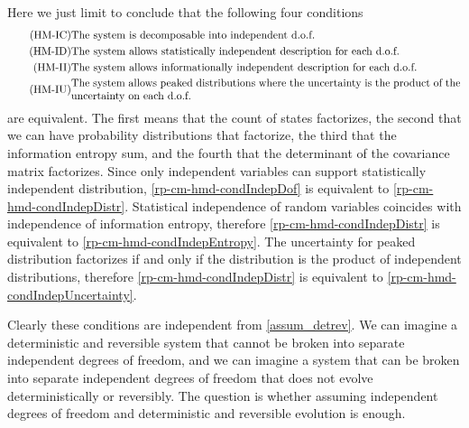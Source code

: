 Here we just limit to conclude that the following four conditions
\begin{align}
	\tag{HM-IC}\label{rp-cm-hmd-condIndepDof}
	&\text{The system is decomposable into independent d.o.f.} \\
	\tag{HM-ID}\label{rp-cm-hmd-condIndepDistr}
	&\text{The system allows statistically independent description for each d.o.f.} \\
	\tag{HM-II}\label{rp-cm-hmd-condIndepEntropy}
	&\text{The system allows informationally independent description for each d.o.f.} \\
	\tag{HM-IU}\label{rp-cm-hmd-condIndepUncertainty}
	&\parbox{5in}{The system allows peaked distributions where the uncertainty is the product of the uncertainty on each d.o.f.}
\end{align}
are equivalent. The first means that the count of states factorizes, the second that we can have probability distributions that factorize, the third that the information entropy sum, and the fourth that the determinant of the covariance matrix factorizes. Since only independent variables can support statistically independent distribution, \ref{rp-cm-hmd-condIndepDof} is equivalent to \ref{rp-cm-hmd-condIndepDistr}. Statistical independence of random variables coincides with independence of information entropy, therefore \ref{rp-cm-hmd-condIndepDistr} is equivalent to \ref{rp-cm-hmd-condIndepEntropy}. The uncertainty for peaked distribution factorizes if and only if the distribution is the product of independent distributions, therefore  \ref{rp-cm-hmd-condIndepDistr} is equivalent to \ref{rp-cm-hmd-condIndepUncertainty}.

Clearly these conditions are independent from \ref{assum_detrev}. We can imagine a deterministic and reversible system that cannot be broken into separate independent degrees of freedom, and we can imagine a system that can be broken into separate independent degrees of freedom that does not evolve deterministically or reversibly. The question is whether assuming independent degrees of freedom and deterministic and reversible evolution is enough. 

